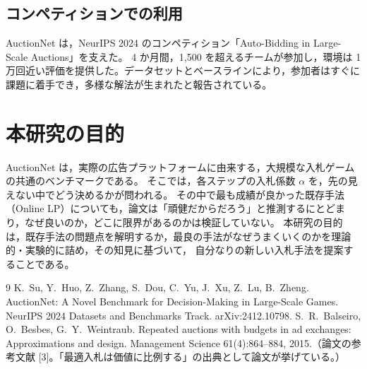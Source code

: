 \documentclass[twocolumn, a4paper, 10pt]{ujarticle}
\begin{document}
\subsection{コンペティションでの利用}

AuctionNet は，NeurIPS 2024 のコンペティション「Auto-Bidding in Large-Scale Auctions」を支えた。
4 か月間，1,500 を超えるチームが参加し，環境は 1 万回近い評価を提供した。データセットとベースラインにより，参加者はすぐに課題に着手でき，多様な解法が生まれたと報告されている。

\section{本研究の目的}

AuctionNet は，実際の広告プラットフォームに由来する，大規模な入札ゲームの共通のベンチマークである。
そこでは，各ステップの入札係数 $\alpha$ を，先の見えない中でどう決めるかが問われる。
その中で最も成績が良かった既存手法（Online LP）についても，論文は「頑健だからだろう」と推測するにとどまり，なぜ良いのか，どこに限界があるのかは検証していない。
本研究の目的は，既存手法の問題点を解明するか，最良の手法がなぜうまくいくのかを理論的・実験的に詰め，その知見に基づいて，
自分なりの新しい入札手法を提案することである。

\begin{thebibliography}{9}\footnotesize
{} K.~Su, Y.~Huo, Z.~Zhang, S.~Dou, C.~Yu, J.~Xu, Z.~Lu, B.~Zheng. AuctionNet: A Novel Benchmark for Decision-Making in Large-Scale Games. NeurIPS 2024 Datasets and Benchmarks Track. arXiv:2412.10798.
 S.~R.~Balseiro, O.~Besbes, G.~Y.~Weintraub. Repeated auctions with budgets in ad exchanges: Approximations and design. Management Science 61(4):864--884, 2015.（論文の参考文献 [3]。「最適入札は価値に比例する」の出典として論文が挙げている。）
\end{thebibliography}
\end{document}
